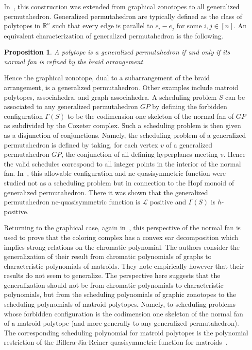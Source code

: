\documentclass[12pt,reqno]{amsart}
\numberwithin{definition}{section}
\newtheorem{proposition}[definition]{Proposition}
\theoremstyle{definition}
\newcommand{\ncL}{\mathcal{L}}
\newcommand{\forb}{\Gamma} %
\begin{document}
In~\cite{ABK}, this construction was extended from graphical zonotopes to all generalized
permutahedron.   Generalized permutahedron are typically
defined as the class of polytopes in $\mathbb{R}^n$ such that every
edge is parallel to $e_i - e_j$ for some $i,j \in [n]$.  An equivalent
characterization of generalized permutahedron is the following.
\begin{proposition}\cite{PRW,MPSSW}
 A
polytope is a generalized permutahedron if and only if its normal fan
is refined by the braid arrangement.
\end{proposition}
  Hence the
graphical zonotope, dual to a subarrangement of the braid arrangement,
is a generalized permutahedron.  Other examples include matroid
polytopes, associahedra, and graph associahedra.  A scheduling problem
$S$ can be associated to any generalized permutahedron $GP$ by
defining the forbidden configuration $\forb(S)$ to be the codimension
one skeleton of the normal fan of $GP$ as subdivided by the Coxeter
complex.  Such a scheduling problem is then given as a disjunction of
conjunctions.  Namely, the scheduling problem of a generalized
permutahedron is defined by taking, for each vertex $v$ of a
generalized permutahedron $GP$, the conjunction of all defining hyperplanes
meeting $v$.  Hence the valid  schedules correspond to all
integer points in the interior of the normal fan.  In~\cite{ABK}, this allowable configuration and nc-quasisymmetric function were studied not as a scheduling problem but in connection to the Hopf monoid of generalized permutahedron.  There it
was shown that the  generalized permutahedron nc-quasisymmetric function is $\ncL$
positive and $\forb(S)$ is $h$-positive.




Returning to the graphical case, again in~\cite{HS}, this perspective of the normal fan is used to prove that the coloring
complex has a convex ear decomposition which implies strong relations on
the chromatic polynomial. The authors consider the generalization of their result from chromatic polynomials of graphs to characteristic polynomials of matroids.
 They note empirically
however that their results do not seem to generalize.  The perspective
here suggests that the generalization should not be from chromatic
polynomials to characteristic polynomials, but from the scheduling
polynomials of graphic zonotopes to the scheduling polynomials of
matroid polytopes.  Namely, to scheduling problems whose forbidden
configuration is the codimension one skeleton of the normal fan of a
matroid polytope  (and more generally to any generalized permutahedron).  The corresponding scheduling polynomial for matroid polytopes is the
polynomial restriction of the Billera-Jia-Reiner quasisymmetric
function for matroids~\cite{BJR}.
\end{document}
